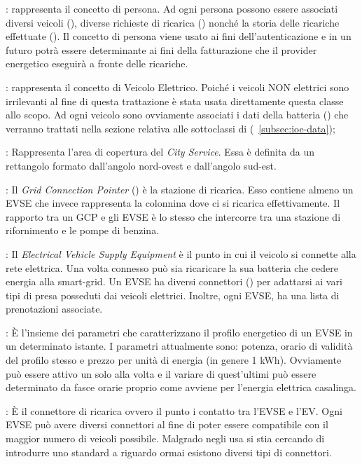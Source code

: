 \begin{description}
	\item {}: rappresenta il concetto di persona. Ad ogni persona possono essere associati diversi veicoli (), diverse richieste di ricarica () nonché la storia delle ricariche effettuate (). Il concetto di persona viene usato ai fini dell'autenticazione e in un futuro potrà essere determinante ai fini della fatturazione che il provider energetico eseguirà a fronte delle ricariche.
	\item {}: rappresenta il concetto di Veicolo Elettrico. Poiché i veicoli NON elettrici sono irrilevanti al fine di questa trattazione è stata usata direttamente questa classe allo scopo. Ad ogni veicolo sono ovviamente associati i dati della batteria () che verranno trattati nella sezione relativa alle sottoclassi di  (~\ref{subsec:ioe-data});
	\item {}: Rappresenta l'area di copertura del \emph{City Service}. Essa è definita da un rettangolo formato dall'angolo nord-ovest e dall'angolo sud-est. 
	\item {}: Il \emph{Grid Connection Pointer} () è la stazione di ricarica. Esso contiene almeno un EVSE che invece rappresenta la colonnina dove ci si ricarica effettivamente. Il rapporto tra un GCP e gli EVSE è lo stesso che intercorre tra una stazione di rifornimento e le pompe di benzina. 
	\item {}: Il \emph{Electrical Vehicle Supply Equipment} è il punto in cui il veicolo si connette alla rete elettrica. Una volta connesso può sia ricaricare la sua batteria che cedere energia alla smart-grid. Un EVSE ha diversi connettori () per adattarsi ai vari tipi di presa posseduti dai veicoli elettrici. Inoltre, ogni EVSE, ha una lista di prenotazioni associate.
	\item {}: È l'insieme dei parametri che caratterizzano il profilo energetico di un EVSE in un determinato istante. I parametri attualmente sono: potenza, orario di validità del profilo stesso e prezzo per unità di energia (in genere 1 kWh). Ovviamente può essere attivo un solo  alla volta e il variare di quest'ultimi può essere determinato da fasce orarie proprio come avviene per l'energia elettrica casalinga.
	\item {}: È il connettore di ricarica ovvero il punto i contatto tra l'EVSE e l'EV. Ogni EVSE può avere diversi connettori al fine di poter essere compatibile con il maggior numero di veicoli possibile. Malgrado negli usa si stia cercando di introdurre uno standard a riguardo ormai esistono diversi tipi di connettori. 

\end{description}
